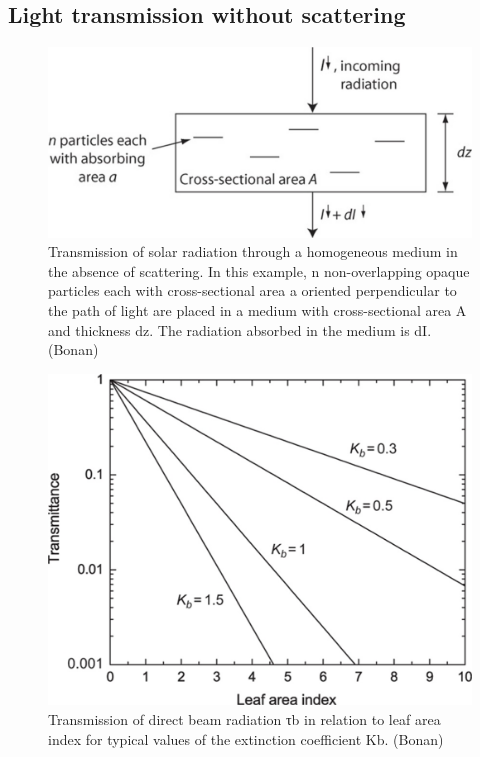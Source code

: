 \documentclass[12pt,oneside]{book}
\begin{document}
\subsection{Light transmission without
scattering}\label{light-transmission-without-scattering}

\begin{figure}

{\centering \includegraphics[width=0.8\linewidth]{figures/chap3/f39_beer} 

}

\caption{Transmission of solar radiation through a homogeneous medium in the absence of scattering. In this example, n non-overlapping opaque particles each with cross-sectional area a oriented perpendicular to the path of light are placed in a medium with cross-sectional area A and thickness dz. The radiation absorbed in the medium is dI.(Bonan)}\label{fig:f39}
\end{figure}

\begin{figure}

{\centering \includegraphics[width=0.8\linewidth]{figures/chap3/f310_Kb} 

}

\caption{Transmission of direct beam radiation τb in relation to leaf area index for typical values of the extinction coefficient Kb. (Bonan)}\label{fig:f310}
\end{figure}
\end{document}
